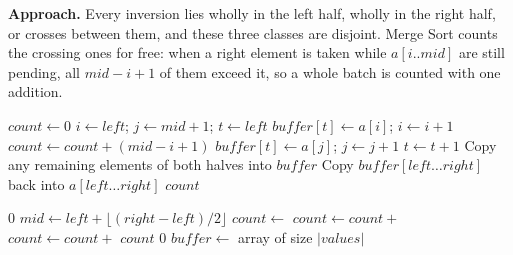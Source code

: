 \documentclass[11pt]{article}
\begin{document}
\textbf{Approach.} Every inversion lies wholly in the left half, wholly in the right half, or crosses between them, and these three classes are disjoint. Merge Sort counts the crossing ones for free: when a right element is taken while $a[i..mid]$ are still pending, all $mid-i+1$ of them exceed it, so a whole batch is counted with one addition.

\begin{algorithm}[H]
\caption{Merge Two Sorted Halves and Count Cross Inversions}
\begin{algorithmic}[1]
    \State $count \gets 0$
    \State $i \gets left$; \quad $j \gets mid + 1$; \quad $t \gets left$
            \State $buffer[t] \gets a[i]$; \quad $i \gets i+1$
        \Else
            \State $count \gets count + (mid - i + 1)$
            \State $buffer[t] \gets a[j]$; \quad $j \gets j+1$
        \EndIf
        \State $t \gets t+1$
    \EndWhile
    \State Copy any remaining elements of both halves into $buffer$
    \State Copy $buffer[left \ldots right]$ back into $a[left \ldots right]$
    \State \Return $count$
\EndFunction
\end{algorithmic}
\end{algorithm}

\begin{algorithm}[H]
\caption{Count Inversions by Modified Merge Sort}
\begin{algorithmic}[1]
        \State \Return $0$ 
    \EndIf
    \State $mid \gets left + \lfloor (right - left)/2 \rfloor$
    \State $count \gets$ 
    \State $count \gets count +$ 
    \State $count \gets count +$ 
    \State \Return $count$
\EndFunction
\Statex
{}
        \State \Return $0$
    \EndIf
    \State $buffer \gets$ array of size $|values|$
    \State \Return {}
\EndFunction
\end{algorithmic}
\end{algorithm}
\end{document}
